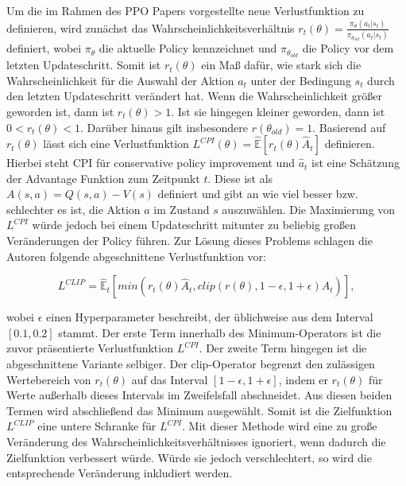 Um die im Rahmen des \ac{PPO} Papers vorgestellte neue Verlustfunktion zu definieren, wird zunächst das Wahrscheinlichkeitsverhältnis $r_t(\theta) = \frac{\pi_\theta(a_t|s_t)}{\pi_{\theta_{old}}(a_t|s_t)}$ definiert, wobei $\pi_\theta$ die aktuelle Policy kennzeichnet und $\pi_{\theta_{old}}$ die Policy vor dem letzten Updateschritt. Somit ist $r_t(\theta)$ ein Maß dafür, wie stark sich die Wahrscheinlichkeit für die Auswahl der Aktion $a_t$ unter der Bedingung $s_t$ durch den letzten Updateschritt verändert hat. Wenn die Wahrscheinlichkeit größer geworden ist, dann ist $r_t(\theta) > 1$. Ist sie hingegen kleiner geworden, dann ist $0 < r_t(\theta) < 1$. Darüber hinaus gilt insbesondere $r(\theta_{old}) = 1$. Basierend auf $r_t(\theta)$ lässt sich eine Verlustfunktion $L^{CPI}(\theta) = \hat{\mathbb{E}}[r_t(\theta) \hat{A}_t]$ definieren. Hierbei steht CPI für conservative policy improvement und $\hat{a}_t$ ist eine Schätzung der Advantage Funktion zum Zeitpunkt $t$. Diese ist als $A(s,a) = Q(s,a) - V(s)$ definiert und gibt an wie viel besser bzw. schlechter es ist, die Aktion $a$ im Zustand $s$ auszuwählen. Die Maximierung von $L^{CPI}$ würde jedoch bei einem Updateschritt mitunter zu beliebig großen Veränderungen der Policy führen. Zur Lösung dieses Problems schlagen die Autoren folgende abgeschnittene Verlustfunktion vor:

\begin{equation}
  \label{L_CLIP}
	L^{CLIP} = \hat{\mathbb{E}}_t[min(r_t(\theta) \hat{A}_t, clip(r(\theta), 1-\epsilon, 1+\epsilon) \hat{A}_t)],
\end{equation}

wobei $\epsilon$ einen Hyperparameter beschreibt, der üblichweise aus dem Interval $[0.1, 0.2]$ stammt. Der erste Term innerhalb des Minimum-Operators ist die zuvor präsentierte Verlustfunktion $L^{CPI}$. Der zweite Term hingegen ist die abgeschnittene Variante selbiger. Der clip-Operator begrenzt den zulässigen Wertebereich von $r_t(\theta)$ auf das Interval $[1-\epsilon, 1+\epsilon]$, indem er $r_t(\theta)$ für Werte außerhalb dieses Intervals im Zweifelsfall abschneidet. Aus diesen beiden Termen wird abschließend das Minimum ausgewählt. Somit ist die Zielfunktion $L^{CLIP}$ eine untere Schranke für $L^{CPI}$. Mit dieser Methode wird eine zu große Veränderung des Wahrscheinlichkeitsverhältnisses ignoriert, wenn dadurch die Zielfunktion verbessert würde. Würde sie jedoch verschlechtert, so wird die entsprechende Veränderung inkludiert werden. \\

